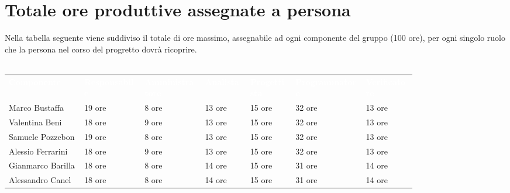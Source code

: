 \section{Totale ore produttive assegnate a persona}
Nella tabella seguente viene suddiviso il totale di ore massimo, assegnabile ad ogni componente del gruppo
(100 ore), per ogni singolo ruolo che la persona nel corso del progretto dovrà ricoprire.\\\\
{\renewcommand{\arraystretch}{1.5}
\scriptsize
\begin{tabular}{p{0.15\linewidth}p{0.12\linewidth}p{0.12\linewidth}p{0.09\linewidth}p{0.09\linewidth}p{0.14\linewidth}p{0.10\linewidth}}
	\rowcolor[RGB]{33, 73, 50}
	\textcolor{white}{\textbf{Componente}} & \textcolor{white}{\textbf{Responsabile}} & \textcolor{white}
	{\textbf{Amministratore}} & \textcolor{white}{\textbf{Analista}} & \textcolor{white}
	{\textbf{Progettista}} & \textcolor{white}{\textbf{Programmatore}} & \textcolor{white}{\textbf{Verificatore}}\\
	\rowcolor[RGB]{216, 235, 171}
	Marco Bustaffa & 19 ore & 8 ore & 13 ore & 15 ore & 32 ore & 13 ore        	\\
	\rowcolor[RGB]{233, 245, 206}
	Valentina Beni & 18 ore & 9 ore & 13 ore & 15 ore & 32 ore & 13 ore        	\\
	\rowcolor[RGB]{216, 235, 171}
	Samuele Pozzebon & 19 ore & 8 ore & 13 ore & 15 ore & 32 ore & 13 ore      	\\
    \rowcolor[RGB]{233, 245, 206}
	Alessio Ferrarini & 18 ore & 9 ore & 13 ore & 15 ore & 32 ore & 13 ore     	\\
    \rowcolor[RGB]{216, 235, 171}
	Gianmarco Barilla & 18 ore & 8 ore & 14 ore & 15 ore & 31 ore & 14 ore     	\\
    \rowcolor[RGB]{233, 245, 206}
	Alessandro Canel & 18 ore & 8 ore & 14 ore & 15 ore & 31 ore & 14 ore    	\\
\end{tabular}	
}